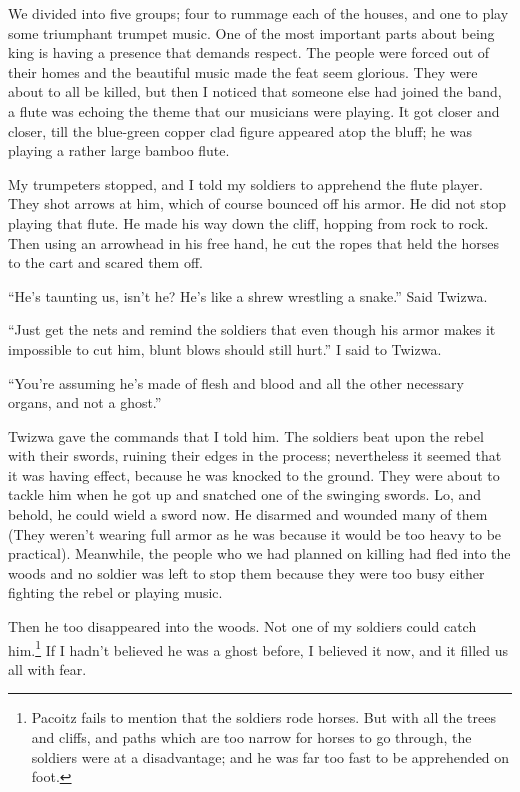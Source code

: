 We divided into five groups; four to rummage each of the houses, and one to play some triumphant trumpet music. One of the most important parts about being king is having a presence that demands respect.
The people were forced out of their homes and the beautiful music made the feat seem glorious. They were about to all be killed, but then I noticed that someone else had joined the band, a flute was echoing the theme that our musicians were playing. It got closer and closer, till the blue-green copper clad figure appeared atop the bluff; he was playing a rather large bamboo flute.

My trumpeters stopped, and I told my soldiers to apprehend the flute player. They shot arrows at him, which of course bounced off his armor. He did not stop playing that flute. He made his way down the cliff, hopping from rock to rock. Then using an arrowhead in his free hand, he cut the ropes that held the horses to the cart and scared them off.

``He's taunting us, isn't he? He's like a shrew wres\-tling a snake.'' Said Twi\-zwa.

``Just get the nets and remind the soldiers that even though his armor makes it impossible to cut him, blunt blows should still hurt.'' I said to Twi\-zwa.

``You're assuming he's made of flesh and blood and all the other necessary organs, and not a ghost.''

Twi\-zwa gave the commands that I told him. The soldiers beat upon the rebel with their swords, ruining their edges in the process; nevertheless it seemed that it was having effect, because he was knocked to the ground. They were about to tackle him when he got up and snatch\-ed one of the swinging swords. Lo, and behold, he could wield a sword now. He disarmed and wounded many of them (They weren't wearing full armor as he was because it would be too heavy to be practical). Meanwhile, the people who we had planned on killing had fled into the woods and no soldier was left to stop them because they were too busy either fighting the rebel or playing music.

Then he too disappeared into the woods. Not one of my soldiers could catch him.\footnote{Pa\-co\-itz fails to mention that the soldiers rode horses. But with all the trees and cliffs, and paths which are too narrow for horses to go through, the soldiers were at a disadvantage; and he was far too fast to be apprehended on foot.} If I hadn't believed he was a ghost before, I believed it now, and it filled us all with fear.

